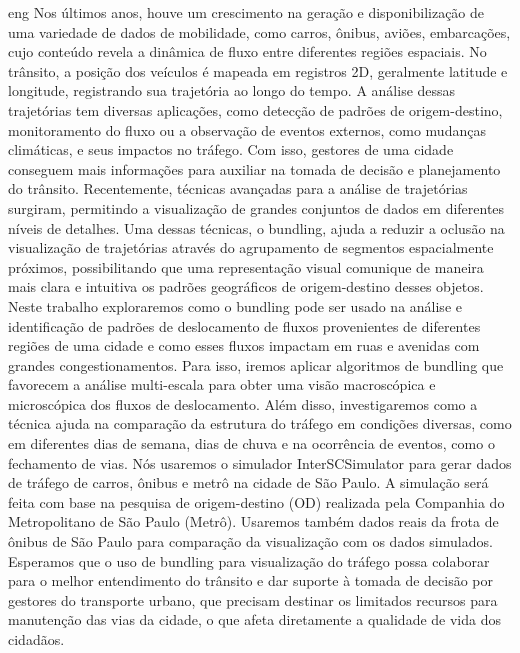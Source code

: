 \begin{resumo}{eng}
  Nos últimos anos, houve um crescimento na geração e disponibilização de uma
variedade de dados de mobilidade, como carros, ônibus, aviões, embarcações,
cujo conteúdo revela a dinâmica de fluxo entre diferentes regiões espaciais. No
trânsito, a posição dos veículos é mapeada em registros 2D, geralmente latitude
e longitude, registrando sua trajetória ao longo do tempo. A análise dessas
trajetórias tem diversas aplicações, como detecção de padrões de
origem-destino, monitoramento do fluxo ou a observação de eventos externos,
como mudanças climáticas, e seus impactos no tráfego. Com isso, gestores de uma
cidade conseguem mais informações para auxiliar na tomada de decisão e
planejamento do trânsito. Recentemente, técnicas avançadas para a análise de
trajetórias surgiram, permitindo a visualização de grandes conjuntos de dados
em diferentes níveis de detalhes. Uma dessas técnicas, o bundling,  ajuda a
reduzir a oclusão na visualização de trajetórias através do agrupamento de
segmentos espacialmente próximos, possibilitando que uma representação visual
comunique de maneira mais clara e intuitiva os padrões geográficos de
origem-destino desses objetos. Neste trabalho exploraremos como o bundling pode
ser usado na análise e identificação de padrões de deslocamento de fluxos
provenientes de diferentes regiões de uma cidade e como esses fluxos impactam
em ruas e avenidas com grandes congestionamentos. Para isso, iremos aplicar
algoritmos de bundling que favorecem a análise multi-escala para obter uma
visão macroscópica e microscópica dos fluxos de deslocamento. Além disso,
investigaremos como a técnica ajuda na comparação da estrutura do tráfego em
condições diversas, como em diferentes dias de semana, dias de chuva e na
ocorrência de eventos, como o fechamento de vias. Nós usaremos o simulador
InterSCSimulator para gerar dados de tráfego de carros, ônibus e metrô na
cidade de São Paulo. A simulação será feita com base na pesquisa de
origem-destino (OD) realizada pela Companhia do Metropolitano de São Paulo
(Metrô). Usaremos também dados reais da frota de ônibus de São Paulo para
comparação da visualização com os dados simulados. Esperamos que o uso de
bundling para visualização do tráfego possa colaborar  para o melhor
entendimento do trânsito e dar suporte à tomada de decisão por gestores do
transporte urbano, que precisam destinar os limitados recursos para manutenção
das vias da cidade, o que afeta diretamente a qualidade de vida dos cidadãos.
\end{resumo}

